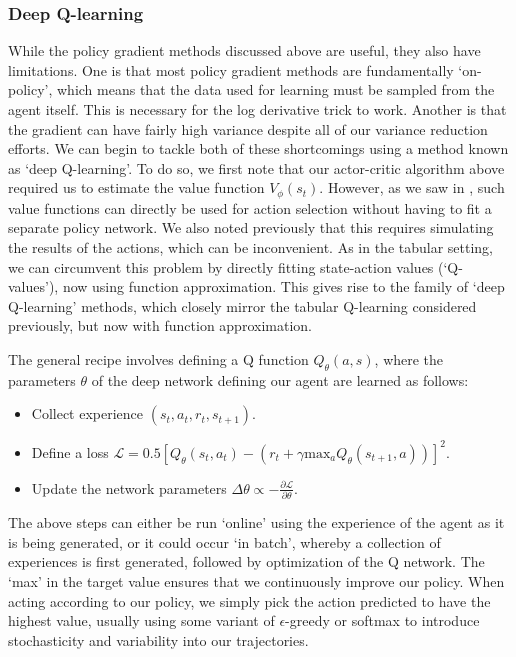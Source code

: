 \subsubsection*{Deep Q-learning}

While the policy gradient methods discussed above are useful, they also have limitations.
One is that most policy gradient methods are fundamentally `on-policy', which means that the data used for learning must be sampled from the agent itself.
This is necessary for the log derivative trick to work.
Another is that the gradient can have fairly high variance despite all of our variance reduction efforts.
We can begin to tackle both of these shortcomings using a method known as `deep Q-learning'.
To do so, we first note that our actor-critic algorithm above required us to estimate the value function $V_\phi(s_t)$.
However, as we saw in , such value functions can directly be used for action selection without having to fit a separate policy network.
We also noted previously that this requires simulating the results of the actions, which can be inconvenient.
As in the tabular setting, we can circumvent this problem by directly fitting state-action values (`Q-values'), now using function approximation.
This gives rise to the family of `deep Q-learning' methods, which closely mirror the tabular Q-learning considered previously, but now with function approximation.

The general recipe involves defining a Q function $Q_\theta(a, s)$, where the parameters $\theta$ of the deep network defining our agent are learned as follows:
\begin{itemize}
    \item Collect experience $(s_t, a_t, r_t, s_{t+1})$.
    \item Define a loss $\mathcal{L} = 0.5 [ Q_\theta(s_t, a_t) - (r_t + \gamma \text{max}_a Q_\theta(s_{t+1}, a)) ]^2 $.
    \item Update the network parameters $\Delta \theta \propto - \frac{\partial \mathcal{L}}{\partial \theta}$.
\end{itemize}
The above steps can either be run `online' using the experience of the agent as it is being generated, or it could occur `in batch', whereby a collection of experiences is first generated, followed by optimization of the Q network.
The `max' in the target value ensures that we continuously improve our policy.
When acting according to our policy, we simply pick the action predicted to have the highest value, usually using some variant of $\epsilon$-greedy or softmax to introduce stochasticity and variability into our trajectories.

